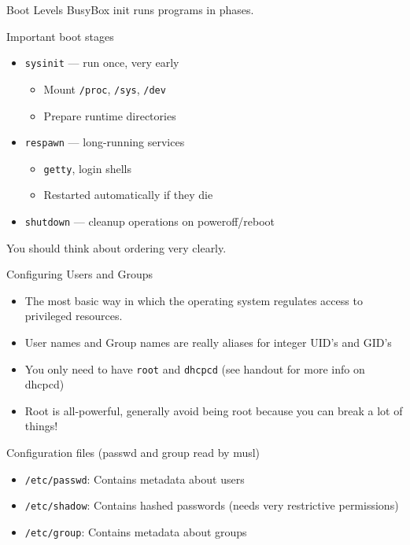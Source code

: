 \documentclass{../lecture}
\begin{document}
\begin{frame}{Boot Levels}
  BusyBox init runs programs in phases.
  \begin{block}{Important boot stages}
    \begin{itemize}
      \item \texttt{sysinit} — run once, very early
        \begin{itemize}
          \item Mount \texttt{/proc}, \texttt{/sys}, \texttt{/dev}
          \item Prepare runtime directories
        \end{itemize}
      \item \texttt{respawn} — long-running services
        \begin{itemize}
          \item \texttt{getty}, login shells
          \item Restarted automatically if they die
        \end{itemize}
      \item \texttt{shutdown} — cleanup operations on poweroff/reboot
    \end{itemize}
  \end{block}
  You should think about ordering very clearly.
\end{frame}

\begin{frame}{Configuring Users and Groups}
  \begin{itemize}
    \item The most basic way in which the operating system regulates access to
      privileged resources.
    \item User names and Group names are really aliases for integer UID's and GID's
    \item You only need to have \texttt{root} and \texttt{dhcpcd} (see handout
      for more info on dhcpcd)
    \item Root is all-powerful, generally avoid being root because you can break
      a lot of things!
  \end{itemize}
  \begin{block}{Configuration files (passwd and group read by musl)}
    \begin{itemize}
      \item \texttt{/etc/passwd}: Contains metadata about users
      \item \texttt{/etc/shadow}: Contains hashed passwords (needs very
        restrictive permissions)
      \item \texttt{/etc/group}: Contains metadata about groups
    \end{itemize}
  \end{block}
\end{frame}
\end{document}
